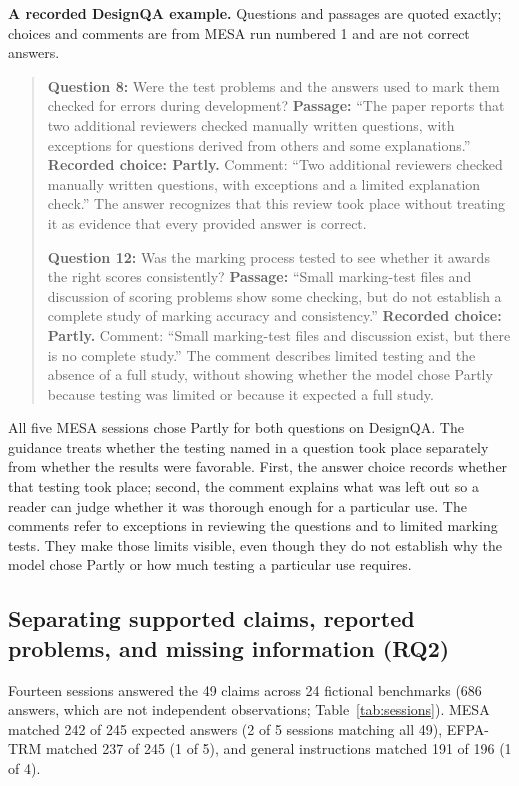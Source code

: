 \documentclass[10pt,conference]{IEEEtran}
\begin{document}
\textbf{A recorded DesignQA example.} Questions and passages are quoted exactly; choices and comments are from MESA run numbered 1 and are not correct answers.

\begin{quote}
\textbf{Question 8:} Were the test problems and the answers used to mark them checked for errors during development? \textbf{Passage:} ``The paper reports that two additional reviewers checked manually written questions, with exceptions for questions derived from others and some explanations.'' \textbf{Recorded choice: Partly.} Comment: ``Two additional reviewers checked manually written questions, with exceptions and a limited explanation check.'' The answer recognizes that this review took place without treating it as evidence that every provided answer is correct.

\textbf{Question 12:} Was the marking process tested to see whether it awards the right scores consistently? \textbf{Passage:} ``Small marking-test files and discussion of scoring problems show some checking, but do not establish a complete study of marking accuracy and consistency.'' \textbf{Recorded choice: Partly.} Comment: ``Small marking-test files and discussion exist, but there is no complete study.'' The comment describes limited testing and the absence of a full study, without showing whether the model chose Partly because testing was limited or because it expected a full study.
\end{quote}

All five MESA sessions chose Partly for both questions on DesignQA. The guidance treats whether the testing named in a question took place separately from whether the results were favorable. First, the answer choice records whether that testing took place; second, the comment explains what was left out so a reader can judge whether it was thorough enough for a particular use. The comments refer to exceptions in reviewing the questions and to limited marking tests. They make those limits visible, even though they do not establish why the model chose Partly or how much testing a particular use requires.

\subsection{Separating supported claims, reported problems, and missing information (RQ2)}
Fourteen sessions answered the 49 claims across 24 fictional benchmarks (686 answers, which are not independent observations; Table~\ref{tab:sessions}). MESA matched 242 of 245 expected answers (2 of 5 sessions matching all 49), EFPA-TRM matched 237 of 245 (1 of 5), and general instructions matched 191 of 196 (1 of 4).
\end{document}
